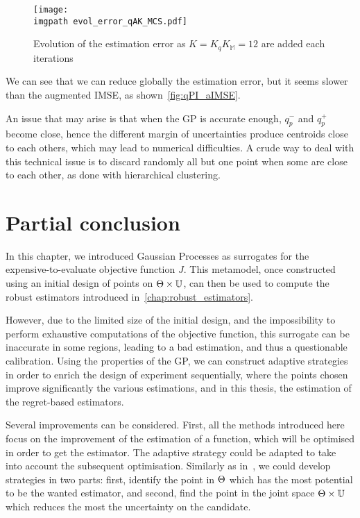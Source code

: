 \documentclass[../../Main_ManuscritThese.tex]{subfiles}
\newcommand\imgpath{/home/victor/acadwriting/Manuscrit/Text/Chapter4/img/}
\begin{document}
\begin{figure}[ht]
  \centering
  \texttt{[image: \\imgpath evol\_error\_qAK\_MCS.pdf]}
  \caption[Evolution of the estimation
    error for $K=K_qK_{\mathbb{M}}=12$]{\label{fig:evol_error_qAK_MCS} Evolution of the estimation
    error as $K=K_qK_{\mathbb{M}}=12$ are added each iterations}
\end{figure}
We can see that we can reduce globally
the estimation error, but it seems slower than the augmented IMSE, as
shown~\cref{fig:qPI_aIMSE}.


An issue that may arise is that when the GP is accurate enough,
$q_p^-$ and $q_p^+$ become close, hence the different margin of
uncertainties produce centroids close to each others, which may lead
to numerical difficulties. A crude way to deal with this technical
issue is to discard randomly all but one point when some are close to
each other, as done with hierarchical clustering.

\section{Partial conclusion}

In this chapter, we introduced Gaussian Processes as surrogates for
the expensive-to-evaluate objective function $J$. This metamodel, once
constructed using an initial design of points on
$\Theta \times \mathbb{U}$, can then be used to compute the robust
estimators introduced in~\cref{chap:robust_estimators}.

However, due to the limited size of the initial design, and the
impossibility to perform exhaustive computations of the objective
function, this surrogate can be inaccurate in some regions, leading to
a bad estimation, and thus a questionable calibration.  Using the
properties of the GP, we can construct adaptive strategies in order
to enrich the design of experiment sequentially, where the points
chosen improve significantly the various estimations, and in this
thesis, the estimation of the regret-based estimators.

Several improvements can be considered. First, all the methods
introduced here focus on the improvement of the estimation of a
function, which will be optimised in order to get the estimator. The
adaptive strategy could be adapted to take into account the subsequent
optimisation. Similarly as in~\cite{janusevskis_simultaneous_2010}, we
could develop strategies in two parts: first, identify the point in
$\Theta$ which has the most potential to be the wanted estimator, and
second, find the point in the joint space $\Theta \times \mathbb{U}$
which reduces the most the uncertainty on the candidate.
\end{document}
